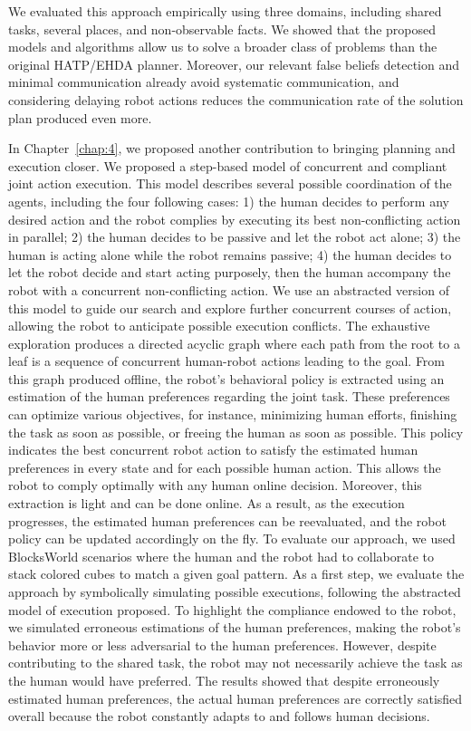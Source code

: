 We evaluated this approach empirically using three domains, including shared tasks, several places, and non-observable facts. We showed that the proposed models and algorithms allow us to solve a broader class of problems than the original HATP/EHDA planner. Moreover, our relevant false beliefs detection and minimal communication already avoid systematic communication, and considering delaying robot actions reduces the communication rate of the solution plan produced even more. 


In Chapter~\ref{chap:4}, we proposed another contribution to bringing planning and execution closer. We proposed a step-based model of concurrent and compliant joint action execution. 
This model describes several possible coordination of the agents, including the four following cases: 1) the human decides to perform any desired action and the robot complies by executing its best non-conflicting action in parallel; 2) the human decides to be passive and let the robot act alone; 3) the human is acting alone while the robot remains passive; 4) the human decides to let the robot decide and start acting purposely, then the human accompany the robot with a concurrent non-conflicting action.
We use an abstracted version of this model to guide our search and explore further concurrent courses of action, allowing the robot to anticipate possible execution conflicts. 
The exhaustive exploration produces a directed acyclic graph where each path from the root to a leaf is a sequence of concurrent human-robot actions leading to the goal. From this graph produced offline, the robot's behavioral policy is extracted using an estimation of the human preferences regarding the joint task. These preferences can optimize various objectives, for instance, minimizing human efforts, finishing the task as soon as possible, or freeing the human as soon as possible.  
This policy indicates the best concurrent robot action to satisfy the estimated human preferences in every state and for each possible human action. This allows the robot to comply optimally with any human online decision.  
Moreover, this extraction is light and can be done online. As a result, as the execution progresses, the estimated human preferences can be reevaluated, and the robot policy can be updated accordingly on the fly.
To evaluate our approach, we used BlocksWorld scenarios where the human and the robot had to collaborate to stack colored cubes to match a given goal pattern. 
As a first step, we evaluate the approach by symbolically simulating possible executions, following the abstracted model of execution proposed. To highlight the compliance endowed to the robot, we simulated erroneous estimations of the human preferences, making the robot's behavior more or less adversarial to the human preferences. However, despite contributing to the shared task, the robot may not necessarily achieve the task as the human would have preferred. The results showed that despite erroneously estimated human preferences, the actual human preferences are correctly satisfied overall because the robot constantly adapts to and follows human decisions. 
